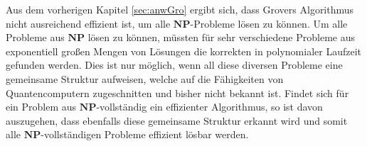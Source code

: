 Aus dem vorherigen Kapitel \ref{sec:anwGro} ergibt sich, dass Grovers Algorithmus nicht ausreichend effizient ist, um alle $\mathbf{NP}$-Probleme lösen zu können. 
Um alle Probleme aus $\mathbf{NP}$ lösen zu können, müssten für sehr verschiedene Probleme aus exponentiell großen Mengen von Lösungen die korrekten in polynomialer Laufzeit gefunden werden. 
Dies ist nur möglich, wenn all diese diversen Probleme eine gemeinsame Struktur aufweisen, welche auf die Fähigkeiten von Quantencomputern zugeschnitten und bisher nicht bekannt ist. 
Findet sich für ein Problem aus $\mathbf{NP}$-vollständig ein effizienter Algorithmus, so ist davon auszugehen, dass ebenfalls diese gemeinsame Struktur erkannt wird und somit alle $\mathbf{NP}$-vollständigen Probleme effizient lösbar werden.